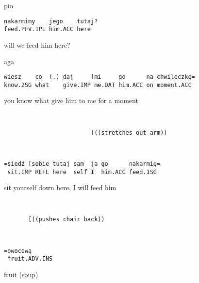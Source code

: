 \documentclass[output=paper]{langsci/langscibook}
\begin{document}
\vspace{2mm}
%
\begin{transbox}{1}{pio}
\begin{verbatim}
nakarmimy    jego    tutaj?
feed.PFV.1PL him.ACC here
\end{verbatim}
will we feed him here?
\end{transbox}
%
\begin{mdframednoverticalspace}[style=firstfoc]
\begin{transbox}{2}{aga}
\begin{verbatim}
wiesz    co  (.) daj     [mi     go      na chwileczkę=
know.2SG what    give.IMP me.DAT him.ACC on moment.ACC
\end{verbatim}
you know what \hspace{0.3cm} give him to me for a moment
\end{transbox}
\end{mdframednoverticalspace}
%
\begin{mdframednoverticalspace}[style=firstfoc]
\begin{transbox}{3}{~}
\begin{verbatim}
                         [((stretches out arm))
\end{verbatim}
\end{transbox}
\end{mdframednoverticalspace}
%
\begin{mdframednoverticalspace}[style=firstfoc]
\begin{transbox}{4}{~}
\begin{verbatim}
=siedź [sobie tutaj sam  ja go      nakarmię=
 sit.IMP REFL here  self I  him.ACC feed.1SG
\end{verbatim}
\hspace{0.07cm} sit yourself down here, I will feed him
\end{transbox}
\end{mdframednoverticalspace}
%
\begin{mdframednoverticalspace}[style=firstfoc]
\begin{transbox}{5}{~}
\begin{verbatim}
       [((pushes chair back))
\end{verbatim}
\end{transbox}
\end{mdframednoverticalspace}
%
\begin{mdframednoverticalspace}[style=firstfoc]
\begin{transbox}{6}{~}
\begin{verbatim}
=owocową
 fruit.ADV.INS
\end{verbatim}
\hspace{0.07cm} fruit (soup)
\end{transbox}
\end{mdframednoverticalspace}
%
\begin{mdframednoverticalspace}[style=secondfoc]
\end{mdframednoverticalspace}
\end{document}
